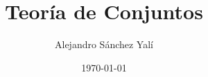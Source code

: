 

\title{Teoría de Conjuntos}
\author{Alejandro Sánchez Yalí}
\date{\today}


\makeglossaries



\frontmatter





\tableofcontents
\listoffigures
\listoftables

\mainmatter





\backmatter

\printbibliography

\printglossaries
\printindex


